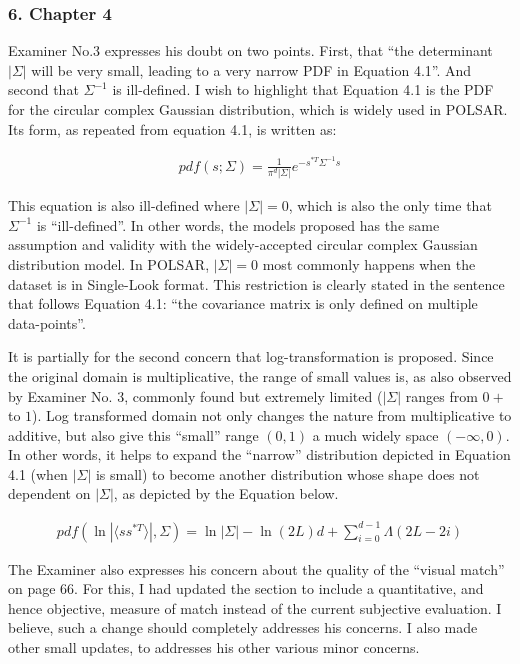 \documentclass{article}
\begin{document}
\subsubsection*{6. Chapter 4}

Examiner No.3 expresses his doubt on two points.
First, that ``the determinant $|\Sigma|$ will be very small, leading to a very narrow PDF in Equation 4.1''.
And second that $\Sigma^{-1}$ is ill-defined.
I wish to highlight that Equation 4.1 is the PDF for the circular complex Gaussian distribution, which is widely used in POLSAR.
Its form, as repeated from equation 4.1, is written as:

\begin{align*}
  pdf(s;\Sigma)=\frac{1}{\pi^d |\Sigma|} e^{-s^{*T}\Sigma^{-1}s}
\end{align*}  

This equation is also ill-defined where $|\Sigma|=0$, which is also the only time that $\Sigma^{-1}$ is ``ill-defined''.
In other words, the models proposed has the same assumption and validity with the widely-accepted circular complex Gaussian distribution model.
In POLSAR, $|\Sigma|=0$ most commonly happens when the dataset is in Single-Look format.
This restriction is clearly stated in the sentence that follows Equation 4.1: ``the covariance matrix is only defined on multiple data-points''.

It is partially for the second concern that log-transformation is proposed.
Since the original domain is multiplicative, the range of small values is, as also observed by Examiner No. 3, commonly found but extremely limited ($|\Sigma|$ ranges from $0+$ to $1$).
Log transformed domain not only changes the nature from multiplicative to additive, but also give this ``small'' range $(0,1)$ a much widely space $(-\infty,0)$.
In other words, it helps to expand the ``narrow'' distribution depicted in Equation 4.1 (when $|\Sigma|$ is small) to become another distribution whose shape does not dependent on $|\Sigma|$, as depicted by the Equation below.

\begin{align*}
  pdf( \ln | \langle ss^{*T} \rangle|, \Sigma) = \ln |\Sigma| - \ln(2L)d + \sum^{d-1}_{i=0} \Lambda (2L-2i)
\end{align*}  

The Examiner also expresses his concern about the quality of the ``visual match'' on page 66.
For this, I had updated the section to include a quantitative, and hence objective, measure of match instead of the current subjective evaluation.
I believe, such a change should completely addresses his concerns.
I also made other small updates, to addresses his other various minor concerns.
\end{document}
